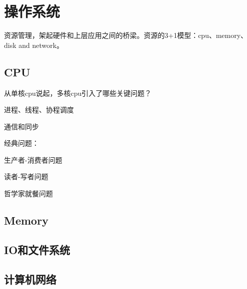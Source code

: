 \chapter{操作系统}

资源管理，架起硬件和上层应用之间的桥梁。资源的3+1模型：cpu、memory、disk and network。

\section{CPU}

从单核cpu说起，多核cpu引入了哪些关键问题？

进程、线程、协程调度

通信和同步

经典问题：
\begin{compactenum}
\item 生产者-消费者问题
\item 读者-写者问题
\item 哲学家就餐问题
\end{compactenum}

\section{Memory}

\section{IO和文件系统}

\section{计算机网络}
